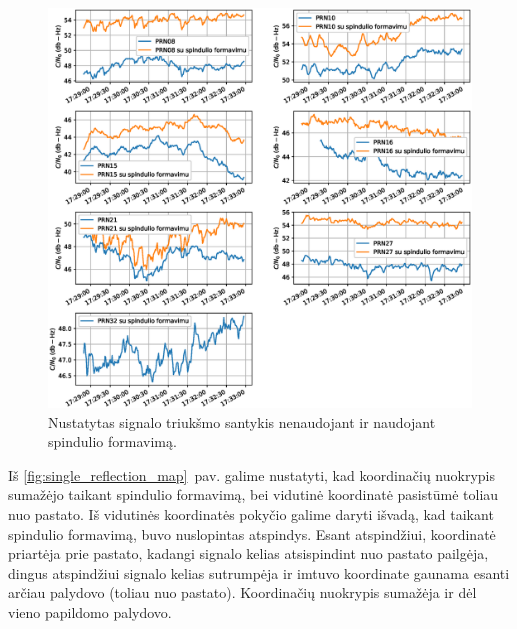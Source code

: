 \documentclass[main.tex]{subfiles}
\begin{document}
\begin{figure}[ht]
    \begin{centering}
    \includegraphics[scale=0.6]{drawings/one_reflection_snr}
    \par\end{centering}
    \protect\caption{\label{fig:single_reflection_snr}Nustatytas signalo triukšmo santykis nenaudojant ir naudojant spindulio formavimą.}
\end{figure}

Iš \ref{fig:single_reflection_map}~pav. galime nustatyti, kad koordinačių nuokrypis sumažėjo taikant spindulio
formavimą, bei vidutinė koordinatė pasistūmė toliau nuo pastato. Iš vidutinės koordinatės pokyčio
galime daryti išvadą, kad taikant spindulio formavimą, buvo nuslopintas atspindys. Esant atspindžiui,
koordinatė priartėja prie pastato, kadangi signalo kelias atsispindint nuo pastato pailgėja, dingus
atspindžiui signalo kelias sutrumpėja ir imtuvo koordinate gaunama esanti arčiau palydovo (toliau nuo pastato).
Koordinačių nuokrypis sumažėja ir dėl vieno papildomo palydovo.
\end{document}
